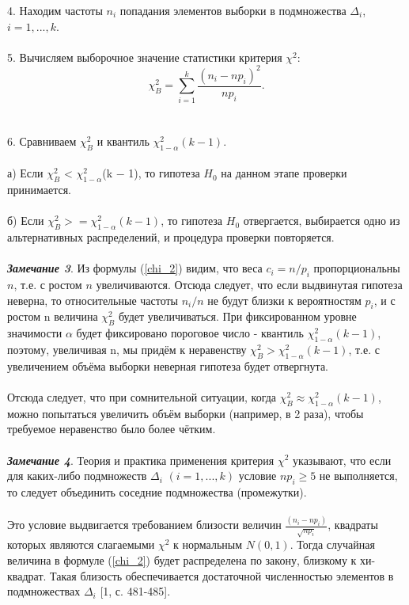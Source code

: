 \documentclass{article}
\begin{document}
4. Находим частоты $n_{i}$ попадания элементов выборки в подмножества $\Delta_{i}$, $i = 1, ... ,k$. 
\\\\
5. Вычисляем выборочное значение статистики критерия $\chi^{2}$:
\begin{equation}
\chi^{2}_{B} =\sum_{i = 1}^{k}{\frac{(n_{i} - np_{i})^{2}}{np_{i}}}.
\label{chi_B}
\end{equation}
\\\\
6. Сравниваем $\chi^{2}_{B}$ и квантиль $\chi^{2}_{1-\alpha}(k-1)$.
\\\\
а) Если $\chi^{2}_{B}$ < $\chi^{2}_{1-\alpha}$(k $-$ 1), то гипотеза $H_{0}$ на данном этапе проверки принимается. 
\\\\
б) Если $\chi^{2}_{B} >= \chi^{2}_{1-\alpha}(k -1)$, то гипотеза $H_{0}$ отвергается, выбирается одно из альтернативных распределений, и процедура проверки повторяется.
\\\\
\textbf{\textit{Замечание 3}}. Из формулы (\ref{chi_2}) видим, что веса $c_i = n/p_{i}$ пропорциональны $n$, т.е. с ростом $n$ увеличиваются. Отсюда следует, что если выдвинутая гипотеза неверна, то относительные частоты $n_{i}/n$ не будут близки к вероятностям $p_{i}$, и с ростом n величина  $\chi^{2}_{B}$  будет увеличиваться. При фиксированном уровне значимости $\alpha$ будет фиксировано пороговое число - квантиль $\chi^{2}_{1-\alpha}(k-1)$, поэтому, увеличивая n, мы придём к неравенству $\chi^{2}_{B} > \chi^{2}_{1-\alpha}(k-1)$, т.е. с увеличением объёма выборки неверная гипотеза будет отвергнута.
\\\\
Отсюда следует, что при сомнительной ситуации, когда $\chi^{2}_{B} \approx \chi^{2}_{1-\alpha}(k-1)$, можно попытаться увеличить объём выборки (например, в 2 раза), чтобы требуемое неравенство было более чётким.
\\\\
\textbf{\textit{Замечание 4}}. Теория и практика применения критерия  $\chi^{2}$ указывают, что если для каких-либо подмножеств $\Delta_{i}$ $(i = 1, ... ,k)$ условие $np_{i} \geq 5$ не выполняется, то следует объединить соседние подмножества (промежутки).
\\\\
Это условие выдвигается требованием близости величин $\frac{(n_{i} -np_{i})}{\sqrt{np_{i}}}$, квадраты которых являются слагаемыми $\chi^{2}$  к нормальным $N(0,1)$. Тогда случайная величина в формуле (\ref{chi_2}) будет распределена по закону, близкому к хи-квадрат. Такая близость обеспечивается достаточной численностью элементов в подмножествах $\Delta_{i}$ [1, с. 481-485].
\end{document}
